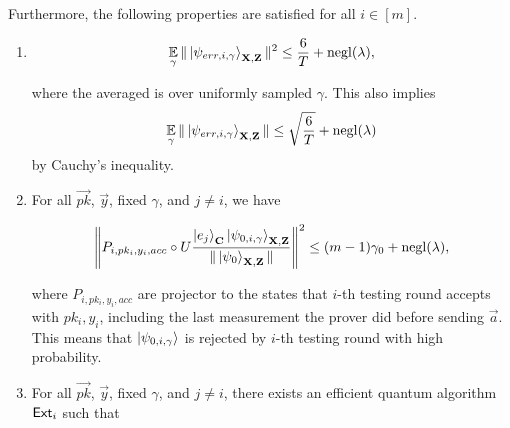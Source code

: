 \begin{lemma}
Furthermore, the following properties are satisfied for all $i\in[m]$.
%
\begin{enumerate}
    \item \label{property:partition-err}  $$\operatorname*{\mathbb{E}}_{\gamma}\|\ket{\psi_{err,i,\gamma}}_{\mathbf{X},\mathbf{Z}}\|^2 \leq \frac{6}{T}+\operatorname{negl}(\lambda),$$
    
    where the averaged is over uniformly sampled $\gamma$. This also implies
    \begin{align}
        \operatorname*{\mathbb{E}}_{\gamma}\|\ket{\psi_{err,i,\gamma}}_{\mathbf{X},\mathbf{Z}}\| \leq \sqrt{\frac{6}{T}}+\operatorname{negl}(\lambda)
    \end{align}
by Cauchy's inequality.
    
        \item \label{property:partition-testing}
For all $\vec{pk}$, $\vec{y}$, fixed $\gamma$, and  $j\neq i$, we have 
 

 \begin{align}
    \left\lVert P_{i,pk_i,y_i,acc} \circ U\frac{\ket{e_j}_{\mathbf{C}}\ket{\psi_{0,i,\gamma}}_{\mathbf{X},\mathbf{Z}}}{\|\ket{\psi_0}_{\mathbf{X},\mathbf{Z}}\|}\right\rVert^2 \leq (m-1)\gamma_0+\operatorname{negl}(\lambda),
 \end{align}
 
 
where $P_{i,pk_i,y_i,acc}$ are projector to the states that $i$-th testing round accepts with $pk_i,y_i$, including the last measurement the prover did before sending $\vec{a}$.  This means that $\ket{\psi_{0,i,\gamma}}$ is rejected by $i$-th testing round with high probability.


    \item \label{property:partition-binding}
    
For all $\vec{pk}$, $\vec{y}$, fixed $\gamma$, and $j\neq i$, there exists an efficient quantum algorithm $\mathsf{Ext}_i$ such that 


\end{enumerate}
\end{lemma}
